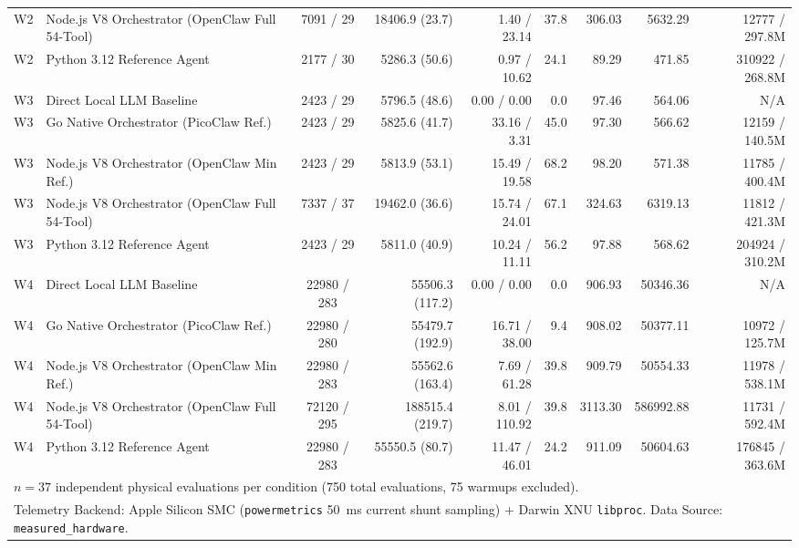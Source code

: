 \begin{table}[t]
\begin{tabular}{l l c r r r r r r}
W2 & Node.js V8 Orchestrator (OpenClaw Full 54-Tool) & 7091 / 29 & 18406.9 (23.7) & 1.40 / 23.14 & 37.8 & 306.03 & 5632.29 & 12777 / 297.8M \\
W2 & Python 3.12 Reference Agent & 2177 / 30 & 5286.3 (50.6) & 0.97 / 10.62 & 24.1 & 89.29 & 471.85 & 310922 / 268.8M \\
\hline
W3 & Direct Local LLM Baseline & 2423 / 29 & 5796.5 (48.6) & 0.00 / 0.00 & 0.0 & 97.46 & 564.06 & N/A \\
W3 & Go Native Orchestrator (PicoClaw Ref.) & 2423 / 29 & 5825.6 (41.7) & 33.16 / 3.31 & 45.0 & 97.30 & 566.62 & 12159 / 140.5M \\
W3 & Node.js V8 Orchestrator (OpenClaw Min Ref.) & 2423 / 29 & 5813.9 (53.1) & 15.49 / 19.58 & 68.2 & 98.20 & 571.38 & 11785 / 400.4M \\
W3 & Node.js V8 Orchestrator (OpenClaw Full 54-Tool) & 7337 / 37 & 19462.0 (36.6) & 15.74 / 24.01 & 67.1 & 324.63 & 6319.13 & 11812 / 421.3M \\
W3 & Python 3.12 Reference Agent & 2423 / 29 & 5811.0 (40.9) & 10.24 / 11.11 & 56.2 & 97.88 & 568.62 & 204924 / 310.2M \\
\hline
W4 & Direct Local LLM Baseline & 22980 / 283 & 55506.3 (117.2) & 0.00 / 0.00 & 0.0 & 906.93 & 50346.36 & N/A \\
W4 & Go Native Orchestrator (PicoClaw Ref.) & 22980 / 280 & 55479.7 (192.9) & 16.71 / 38.00 & 9.4 & 908.02 & 50377.11 & 10972 / 125.7M \\
W4 & Node.js V8 Orchestrator (OpenClaw Min Ref.) & 22980 / 283 & 55562.6 (163.4) & 7.69 / 61.28 & 39.8 & 909.79 & 50554.33 & 11978 / 538.1M \\
W4 & Node.js V8 Orchestrator (OpenClaw Full 54-Tool) & 72120 / 295 & 188515.4 (219.7) & 8.01 / 110.92 & 39.8 & 3113.30 & 586992.88 & 11731 / 592.4M \\
W4 & Python 3.12 Reference Agent & 22980 / 283 & 55550.5 (80.7) & 11.47 / 46.01 & 24.2 & 911.09 & 50604.63 & 176845 / 363.6M \\
\hline
\multicolumn{9}{l}{\footnotesize $n = 37$ independent physical evaluations per condition (750 total evaluations, 75 warmups excluded).} \\
\multicolumn{9}{l}{\footnotesize Telemetry Backend: Apple Silicon SMC (\texttt{powermetrics} 50~ms current shunt sampling) + Darwin XNU \texttt{libproc}. Data Source: \texttt{measured\_hardware}.} \\
\hline
\end{tabular}
\end{table}
